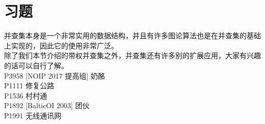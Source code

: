 \documentclass{beamer}
\begin{document}
\section{习题}
\begin{frame}
并查集本身是一个非常实用的数据结构，并且有许多图论算法也是在并查集的基础上实现的，因此它的使用非常广泛。\\
除了我们本节介绍的带权并查集之外，并查集还有许多别的扩展应用，大家有兴趣的话可以自行了解。\\
P3958	[NOIP 2017 提高组] 奶酪\\ 
P1111	修复公路	\\
P1536	村村通\\
P1892	[BalticOI 2003] 团伙\\
P1991	无线通讯网\\
\end{frame}
\end{document}
